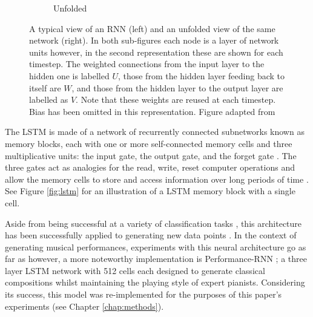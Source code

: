 \documentclass[a4paper]{book}
\begin{document}
\begin{figure}[t]
\begin{subfigure}{.74\linewidth}
        \caption{Unfolded}
        \label{fig:rnn_unfolded}
    \end{subfigure}
    \caption{A typical view of an RNN (left) and an unfolded view of the same network (right). In both sub-figures each node is a layer of network units however, in the second representation these are shown for each timestep. The weighted connections from the input layer to the hidden one is labelled $U$, those from the hidden layer feeding back to itself are $W$, and those from the hidden layer to the output layer are labelled as $V$. Note that these weights are reused at each timestep. Bias has been omitted in this representation. Figure adapted from \textcite{graves_supervised_2012}}
\end{figure}

The LSTM is made of a network of recurrently connected subnetworks known as memory blocks, each with one or more self-connected memory cells and three multiplicative units: the input gate, the output gate, and the forget gate \parencite{hochreiter_long_1997}. The three gates act as analogies for the read, write, reset computer operations and allow the memory cells to store and access information over long periods of time \parencite{graves_supervised_2012}. See Figure \ref{fig:lstm} for an illustration of a LSTM memory block with a single cell.

Aside from being successful at a variety of classification tasks \parencite[e.g.,][]{graves_framewise_2005}, this architecture has been successfully applied to generating new data points \parencite[such as creating sequences of text;][]{graves_generating_2013}. In the context of generating musical performances, experiments with this neural architecture go as far as \textcite{eck_first_2002} however, a more noteworthy implementation is Performance-RNN \parencite{oore_this_2018}; a three layer LSTM network with 512 cells each designed to generate classical compositions whilst maintaining the playing style of expert pianists. Considering its success, this model was re-implemented for the purposes of this paper's experiments (see Chapter \ref{chap:methods}).
\end{document}

